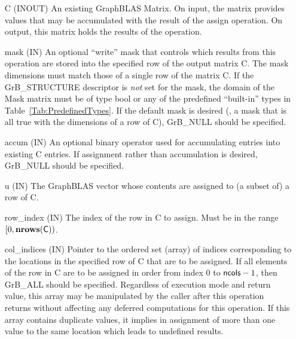 \begin{itemize}[leftmargin=1.1in]
    \item[{\sf C}]    ({\sf INOUT}) An existing GraphBLAS Matrix.  On input,
    the matrix provides values that may be accumulated with the result of the
    assign operation.  On output, this matrix holds the results of the
    operation.

    \item[{\sf mask}] ({\sf IN}) An optional ``write'' mask that controls which
    results from this operation are stored into the specified row of the output matrix {\sf C}. The 
    mask dimensions must match those of a single row of the matrix {\sf C}. If the 
    {\sf GrB\_STRUCTURE} descriptor is {\em not} set for the mask, the domain of the 
    {\sf Mask} matrix must be of type {\sf bool} or any of the predefined 
    ``built-in'' types in Table~\ref{Tab:PredefinedTypes}.  If the default
    mask is desired (\ie, a mask that is all {\sf true} with the dimensions of a row of {\sf C}), 
    {\sf GrB\_NULL} should be specified.

    \item[{\sf accum}] ({\sf IN}) An optional binary operator used for accumulating
    entries into existing {\sf C} entries. If assignment rather than accumulation is
    desired, {\sf GrB\_NULL} should be specified.

    \item[{\sf u}]       ({\sf IN}) The GraphBLAS vector whose contents are 
    assigned to (a subset of) a row of {\sf C}.

    \item[{\sf row\_index}]  ({\sf IN}) The index of the row in {\sf C} to 
    assign. Must be in the range $[0, \bold{nrows}({\sf C}))$.

    \item[{\sf col\_indices}]  ({\sf IN}) Pointer to the ordered set (array) of 
    indices corresponding to the locations in the specified row of {\sf C} 
    that are to be assigned.  If all elements of the row in {\sf C} are to be 
    assigned in order from index $0$ to ${\sf ncols} - 1$, then {\sf GrB\_ALL} should be 
    specified.  Regardless of execution mode and return value, this array may be
    manipulated by the caller after this operation returns without affecting any 
    deferred computations for this operation.
    If this array contains duplicate values, it implies in assignment of more 
    than one value to the same location which leads to undefined results.
    

\end{itemize}
